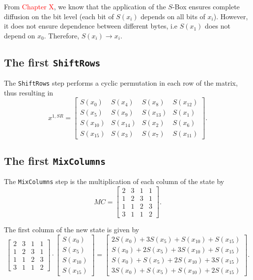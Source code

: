 \documentclass{report}
\begin{document}
From \textcolor{red}{Chapter X}, we know that the application of the $S$-Box ensures complete diffusion on the bit level (each bit of $S(x_i)$ depends on all bits of $x_i$). However, it does not ensure dependence between different bytes, i.e $S(x_1)$ does not depend on $x_0$. Therefore, $S(x_i) \rightarrow x_i$.

\subsection{The first \texttt{ShiftRows}}
The \texttt{ShiftRows} step performs a cyclic permutation in each row of the matrix, thus resulting in
\begin{equation*}
x^{1, SR} =
\begin{bmatrix}
S(x_0) & S(x_4) & S(x_8) & S(x_{12})\\
S(x_5) & S(x_9) & S(x_{13}) & S(x_{1})\\
S(x_{10}) & S(x_{14}) & S(x_{2}) & S(x_{6})\\
S(x_{15}) & S(x_3) & S(x_{7}) & S(x_{11})
\end{bmatrix}.
\end{equation*}

\subsection{The first \texttt{MixColumns}}\label{sec:first-mc}

The \texttt{MixColumns} step is the multiplication of each column of the state by
\begin{equation*}
MC = 
\begin{bmatrix}
2 & 3 & 1 & 1\\
1 & 2 & 3 & 1\\
1 & 1 & 2 & 3\\
3 & 1 & 1 & 2
\end{bmatrix}.
\end{equation*}

The first column of the new state is given by
\begin{equation*}
\begin{bmatrix}
2 & 3 & 1 & 1\\
1 & 2 & 3 & 1\\
1 & 1 & 2 & 3\\
3 & 1 & 1 & 2
\end{bmatrix} \cdot
\begin{bmatrix}
S(x_0) \\
S(x_5) \\
S(x_{10}) \\
S(x_{15}) 
\end{bmatrix} =
\begin{bmatrix}
2S(x_0) + 3S(x_5) + S(x_{10}) + S(x_{15})\\
S(x_0) + 2S(x_5) + 3S(x_{10}) + S(x_{15})\\
S(x_0) + S(x_5) + 2S(x_{10}) + 3S(x_{15})\\
3S(x_0) + S(x_5) + S(x_{10}) + 2S(x_{15})
\end{bmatrix}. 
\end{equation*}
\end{document}
